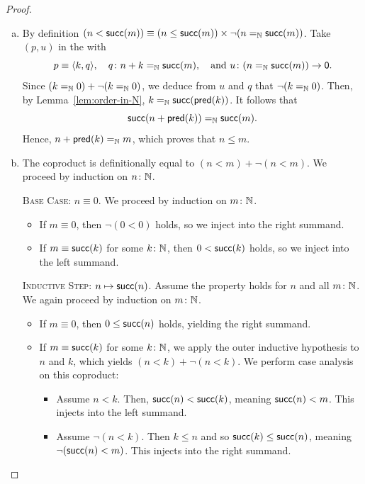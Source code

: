 \begin{proof}
\begin{enumerate}[a), font=\upshape]
\begin{itemize}
\begin{itemize}
                \item If $s\colon m\le n$, then $(s,z')$, with $z'\defeq\lambda q\colon(m\eq\N n).\,z(q^{-1})$, is a term of $m<n$. Thus, $v(s,z')\colon\fun0$ and
                \[
                    \fun{rec}_{\fun0}(n\eq\N m,v(s,z'))
                        \colon(n\eq\N m).
                \]
            \end{itemize}
        \end{itemize}
        
        \item By definition $(n<\mathsf{succ}(m))\equiv(n\le \mathsf{succ}(m))\times\neg(n\mathrel{=_{\mathbb{N}}}\mathsf{succ}(m))$. Take $(p,u)$ in the \rhs with 
        \[
            p\equiv\dep{k,q},
            \quad q\colon n+k\eq\N\fun{succ}(m),
            \quad\text{and }u\colon(n\eq\N\fun{succ}(m))\to\fun0.
        \]
        Since $(k\mathrel{=_{\mathbb{N}}}0)+\neg(k\mathrel{=_{\mathbb{N}}}0)$, we deduce from $u$ and $q$ that $\neg(k\mathrel{=_{\mathbb{N}}}0)$. Then, by Lemma~\ref{lem:order-in-N}, $k\mathrel{=_{\mathbb{N}}}\mathsf{succ}(\mathsf{pred}(k))$. It follows that
        \[
            \mathsf{succ}(n+\mathsf{pred}(k))\mathrel{=_{\mathbb{N}}}\mathsf{succ}(m).
        \]
        Hence, $n+\mathsf{pred}(k)\mathrel{=_{\mathbb{N}}} m$, which proves that $n\le m$.
        
        \item The coproduct is definitionally equal to $(n<m)+\neg(n<m)$. We proceed by induction on $n\colon\N$.
        
        \textsc{Base Case: $n\equiv0$.} We proceed by induction on $m\colon\N$.
        \begin{itemize}
            \item If $m\equiv0$, then $\neg(0<0)$ holds, so we inject into the right summand.
        
            \item If $m\equiv\mathsf{succ}(k)$ for some $k\colon\N$, then $0<\mathsf{succ}(k)$ holds, so we inject into the left summand.
        \end{itemize}
        
        \textsc{Inductive Step: $n\mapsto\mathsf{succ}(n)$.} Assume the property holds for $n$ and all $m\colon\N$. We again proceed by induction on $m\colon\N$.
        \begin{itemize}
            \item If $m\equiv0$, then $0\le\mathsf{succ}(n)$ holds, yielding the right summand.
            \item If $m\equiv\mathsf{succ}(k)$ for some $k\colon\N$, we apply the outer inductive hypothesis to $n$ and $k$, which yields $(n<k)+\neg(n<k)$. We perform case analysis on this coproduct:
            \begin{itemize}
                \item Assume $n<k$. Then, $\mathsf{succ}(n)<\mathsf{succ}(k)$, meaning $\mathsf{succ}(n)<m$. This injects into the left summand.
                \item Assume $\neg(n<k)$. Then $k\le n$ and so $\mathsf{succ}(k)\le\mathsf{succ}(n)$, meaning $\neg(\mathsf{succ}(n)<m)$. This injects into the right summand.
            \end{itemize}
        \end{itemize}


\end{enumerate}
\end{proof}

